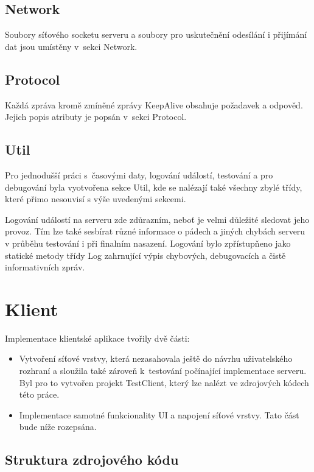 \documentclass[thesis=B,czech]{FITthesis}[2013/10/20]
\begin{document}
\subsection{Network}
Soubory síťového socketu serveru a soubory pro uskutečnění odesílání i přijímání dat jsou umístěny v~sekci Network. 

\subsection{Protocol}
Každá zpráva kromě zmíněné zprávy KeepAlive obsahuje požadavek a odpověd. Jejich popis atributy je popsán v~sekci Protocol.

\subsection{Util}
Pro jednodušší práci s~časovými daty, logování událostí, testování a pro debugování byla vyotvořena sekce Util, kde se nalézají také všechny zbylé třídy, které přimo nesouvisí s výše uvedenými sekcemi.

Logování událostí na serveru zde zdůrazním, neboť je velmi důležité sledovat jeho provoz. Tím lze také sesbírat různé informace o pádech a jiných chybách serveru v průběhu testování i při finalním nasazení. Logování bylo zpřístupňeno jako statické metody třídy Log zahrnující výpis chybových, debugovacích a čistě informativních zpráv.

\section{Klient}

Implementace klientské aplikace tvořily dvě části:

\begin{itemize}
	\item{Vytvoření síťové vrstvy, která nezasahovala ještě do návrhu uživatelského rozhraní a sloužila také zároveň k~testování počínající implementace serveru. Byl pro to vytvořen projekt TestClient, který lze nalézt ve zdrojových kódech této práce.}
	\item{Implementace samotné funkcionality UI a napojení síťové vrstvy. Tato část bude níže rozepsána.}
\end{itemize}

\subsection{Struktura zdrojového kódu}
\end{document}
